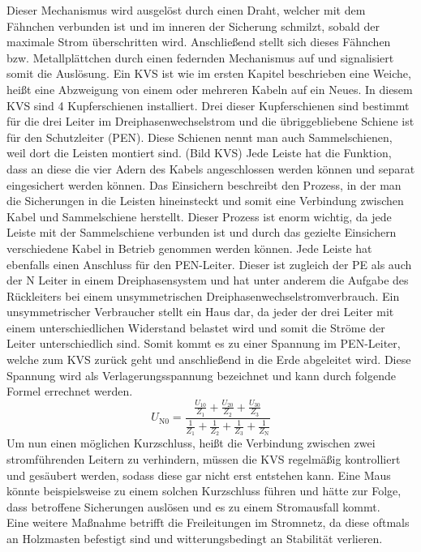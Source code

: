 Dieser Mechanismus wird ausgelöst durch einen Draht, welcher mit dem Fähnchen verbunden ist und im inneren der Sicherung schmilzt, sobald der maximale Strom 
überschritten wird. Anschließend stellt sich dieses Fähnchen bzw. Metallplättchen durch einen federnden Mechanismus auf und signalisiert somit die Auslösung. 
Ein KVS ist wie im ersten Kapitel beschrieben eine Weiche, heißt eine Abzweigung von einem oder mehreren Kabeln auf ein Neues. In diesem KVS sind 
4 Kupferschienen installiert. Drei dieser Kupferschienen sind bestimmt für die drei Leiter im Dreiphasenwechselstrom und die übriggebliebene Schiene ist 
für den Schutzleiter (PEN). Diese Schienen nennt man auch Sammelschienen, weil dort die Leisten montiert sind. (Bild KVS) Jede Leiste hat die Funktion, 
dass an diese die vier Adern des Kabels angeschlossen werden können und separat eingesichert werden können. Das Einsichern beschreibt den Prozess, in der 
man die Sicherungen in die Leisten hineinsteckt und somit eine Verbindung zwischen Kabel und Sammelschiene herstellt. Dieser Prozess ist enorm wichtig, 
da jede Leiste mit der Sammelschiene verbunden ist und durch das gezielte Einsichern verschiedene Kabel in Betrieb genommen werden können. Jede Leiste 
hat ebenfalls einen Anschluss für den PEN-Leiter. Dieser ist zugleich der PE als auch der N Leiter in einem Dreiphasensystem und hat unter anderem die 
Aufgabe des Rückleiters bei einem unsymmetrischen Dreiphasenwechselstromverbrauch. Ein unsymmetrischer Verbraucher stellt \zB ein Haus dar, da jeder der 
drei Leiter mit einem unterschiedlichen Widerstand belastet wird und somit die Ströme der Leiter unterschiedlich sind. Somit kommt es zu einer Spannung 
im PEN-Leiter, welche zum KVS zurück geht und anschließend in die Erde abgeleitet wird. Diese Spannung wird als Verlagerungsspannung bezeichnet und kann 
durch folgende Formel errechnet werden.
\begin{equation}
U_{\text{N0}}=\frac{\frac{U_{10}}{Z_1}+\frac{U_{20}}{Z_2}+\frac{U_{30}}{Z_3}}{\frac{1}{Z_1}+\frac{1}{Z_2}+\frac{1}{Z_3}+\frac{1}{Z_\text{N}}}
\label{eqn:Verlagerungsspannung}
\end{equation}
Um nun einen möglichen Kurzschluss, heißt die Verbindung zwischen zwei stromführenden Leitern zu verhindern, müssen die KVS regelmäßig kontrolliert und 
gesäubert werden, sodass diese gar nicht erst entstehen kann. Eine Maus könnte beispielsweise zu einem solchen Kurzschluss führen und hätte zur Folge, 
dass betroffene Sicherungen auslösen und es zu einem Stromausfall kommt.
\\ 
Eine weitere Maßnahme betrifft die Freileitungen im Stromnetz, da diese oftmals an Holzmasten befestigt sind und witterungsbedingt an Stabilität verlieren. 
